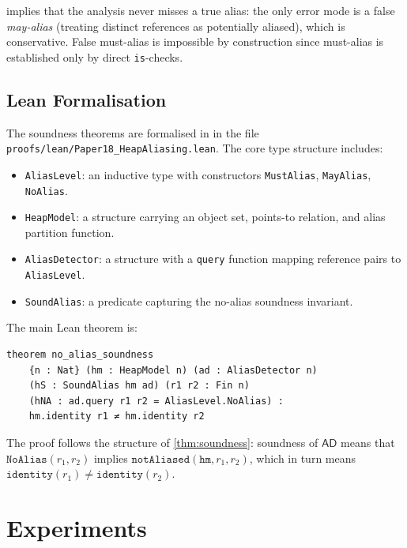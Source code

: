 \documentclass[11pt]{article}
\newcommand{\AD}{\mathsf{AD}}               %
\begin{document}
\begin{remark}
   implies that the analysis never misses a
  true alias: the only error mode is a false \emph{may-alias} (treating
  distinct references as potentially aliased), which is conservative.
  False must-alias is impossible by construction since must-alias is
  established only by direct \texttt{is}-checks.
\end{remark}

\subsection{Lean Formalisation}

The soundness theorems are formalised in \LEAN{} in the file
\texttt{proofs/lean/Paper18\_HeapAliasing.lean}.  The core type
structure includes:

\begin{itemize}[noitemsep]
  \item \texttt{AliasLevel}: an inductive type with constructors
    \texttt{MustAlias}, \texttt{MayAlias}, \texttt{NoAlias}.
  \item \texttt{HeapModel}: a structure carrying an object set,
    points-to relation, and alias partition function.
  \item \texttt{AliasDetector}: a structure with a \texttt{query}
    function mapping reference pairs to \texttt{AliasLevel}.
  \item \texttt{SoundAlias}: a predicate capturing the no-alias soundness
    invariant.
\end{itemize}

The main Lean theorem is:
\begin{lstlisting}[style=jugeo-output]
theorem no_alias_soundness
    {n : Nat} (hm : HeapModel n) (ad : AliasDetector n)
    (hS : SoundAlias hm ad) (r1 r2 : Fin n)
    (hNA : ad.query r1 r2 = AliasLevel.NoAlias) :
    hm.identity r1 ≠ hm.identity r2
\end{lstlisting}
The proof follows the structure of \cref{thm:soundness}: soundness of
$\AD$ means that $\mathtt{NoAlias}(r_1,r_2)$ implies
$\mathtt{notAliased}(\mathtt{hm}, r_1, r_2)$, which in turn means
$\mathtt{identity}(r_1) \neq \mathtt{identity}(r_2)$.

\section{Experiments}
\label{sec:experiments}
\end{document}
